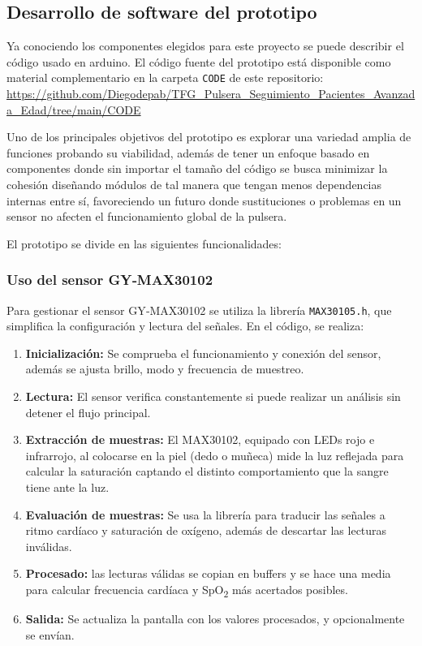 \documentclass[12pt, a4paper]{article}
\begin{document}
	
	\subsection{Desarrollo de software del prototipo}
	
	Ya conociendo los componentes elegidos para este proyecto se puede describir el código usado en arduino. El código fuente del prototipo está disponible como material complementario en la carpeta \texttt{CODE} de este repositorio:  
	\url{https://github.com/Diegodepab/TFG_Pulsera_Seguimiento_Pacientes_Avanzada_Edad/tree/main/CODE}
	
	Uno de los principales objetivos del prototipo es explorar una variedad amplia de funciones probando su viabilidad, además de tener un enfoque basado en componentes donde sin importar el tamaño del código se busca minimizar la cohesión diseñando módulos de tal manera que tengan menos dependencias internas entre sí, favoreciendo un futuro donde sustituciones o problemas en un sensor no afecten el funcionamiento global de la pulsera.
	
	El prototipo se divide en las siguientes funcionalidades:
	
		\subsubsection{Uso del sensor GY‑MAX30102}
	Para gestionar el sensor GY‑MAX30102 se utiliza la librería \texttt{MAX30105.h}, que simplifica la configuración y lectura del señales. En el código, se realiza:
	
	\begin{enumerate}
		\item \textbf{Inicialización:} Se comprueba el funcionamiento y conexión del sensor, además se ajusta brillo, modo y frecuencia de muestreo.
		\item \textbf{Lectura:} El sensor verifica constantemente si puede realizar un análisis sin detener el flujo principal.
		\item \textbf{Extracción de muestras:} El MAX30102, equipado con LEDs rojo e infrarrojo, al colocarse en la piel (dedo o muñeca) mide la luz reflejada para calcular la saturación captando el distinto comportamiento que la sangre tiene ante la luz.
		\item \textbf{Evaluación de muestras:} Se usa la librería para traducir las señales a ritmo cardíaco y saturación de oxígeno, además de descartar las lecturas inválidas.
		\item \textbf{Procesado:} las lecturas válidas se copian en buffers y se hace una media para calcular frecuencia cardíaca y SpO\textsubscript{2} más acertados posibles.
		\item \textbf{Salida:} Se actualiza la pantalla con los valores procesados, y opcionalmente se envían.
	\end{enumerate}
	
\end{document}
